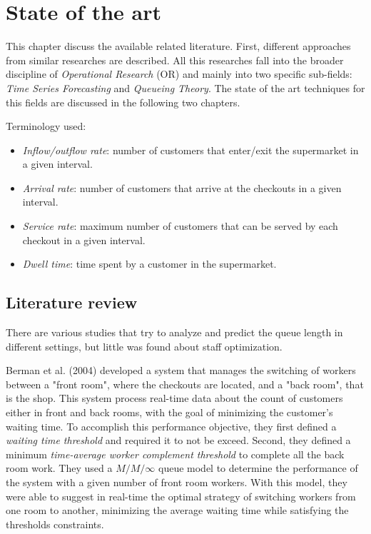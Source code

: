 \chapter{State of the art}
\label{cha:state_of_art}

This chapter discuss the available related literature. First, different approaches from similar researches are described. All this researches fall into the broader discipline of \emph{Operational Research} (OR) and mainly into two specific sub-fields: \emph{Time Series Forecasting} and \emph{Queueing Theory}. The state of the art techniques for this fields are discussed in the following two chapters.

Terminology used:
\begin{itemize}
  \item \emph{Inflow/outflow rate}: number of customers that enter/exit the supermarket in a given interval.
  \item \emph{Arrival rate}: number of customers that arrive at the checkouts in a given interval.
  \item \emph{Service rate}: maximum number of customers that can be served by each checkout in a given interval.
  \item \emph{Dwell time}: time spent by a customer in the supermarket.
\end{itemize}

\section{Literature review}
\label{sec:literature_review}

There are various studies that try to analyze and predict the queue length in different settings, but little was found about staff optimization.

Berman et al. (2004) \cite{berman} developed a system that manages the switching of workers between a "front room", where the checkouts are located, and a "back room", that is the shop. This system process real-time data about the count of customers either in front and back rooms, with the goal of minimizing the customer's waiting time. To accomplish this performance objective, they first defined a \emph{waiting time threshold} and required it to not be exceed. Second, they defined a minimum \emph{time-average worker complement threshold} to complete all the back room work. They used a \( M/M/\infty \) queue model to determine the performance of the system with a given number of front room workers. With this model, they were able to suggest in real-time the optimal strategy of switching workers from one room to another, minimizing the average waiting time while satisfying the thresholds constraints.

